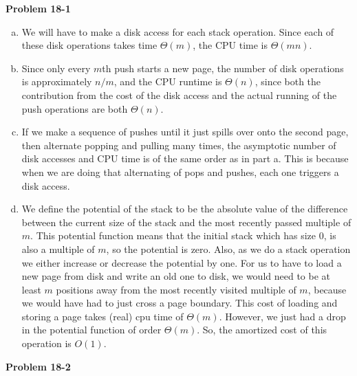 \documentclass{article}
\begin{document}
\noindent\textbf{Problem 18-1}\\

\begin{enumerate}[a.]
\item
We will have to make a disk access for each stack operation. Since each of these disk operations takes time $\Theta(m)$, the CPU time is $\Theta(mn)$.

\item
Since only every $m$th push starts a new page, the number of disk operations is approximately $n/m$, and the CPU runtime is $\Theta(n)$, since both the contribution from the cost of the disk access and the actual running of the push operations are both $\Theta(n)$.
\item
If we make a sequence of pushes until it just spills over onto the second page, then alternate popping and pulling many times, the asymptotic number of disk accesses and CPU time is of the same order as in part a. This is because when we are doing that alternating of pops and pushes, each one triggers a disk access.
\item
We define the potential of the stack to be the absolute value of the difference between the current size of the stack and the most recently passed multiple of $m$. This potential function means that the initial stack which has size 0, is also a multiple of $m$, so the potential is zero. Also, as we do a stack operation we either increase or decrease the potential by one. For us to have to load a new page from disk and write an old one to disk, we would need to be at least $m$ positions away from the most recently visited multiple of $m$, because we would have had to just cross a page boundary. This cost of loading and storing a page takes (real) cpu time of $\Theta(m)$. However, we just had a drop in the potential function of order $\Theta(m)$. So, the amortized cost of this operation is $O(1)$.
\end{enumerate}
\noindent\textbf{Problem 18-2}\\
\end{document}
